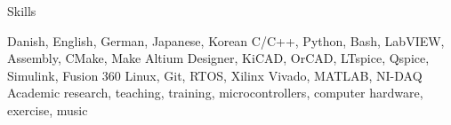 \begin{rubric}{\faStar[solid] Skills}

\entry*[Languages][\faLanguage]
	Danish, English, German, Japanese, Korean
\entry*[Coding][\faCode]
	C/C++, Python, Bash, LabVIEW, Assembly, CMake, Make
	Altium Designer, KiCAD, OrCAD, LTspice, Qspice, Simulink, Fusion 360
\entry*[Technologies][\faTerminal]
	Linux, Git, RTOS, Xilinx Vivado, MATLAB, NI-DAQ
\entry*[Misc.][\faUser]
	Academic research, teaching, training, microcontrollers, computer hardware, exercise, music
\end{rubric}
